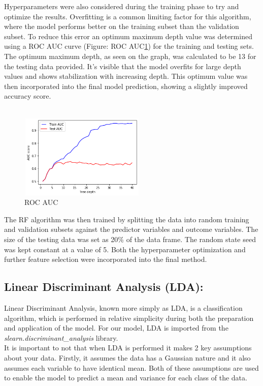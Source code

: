 \documentclass{article}
\begin{document}
Hyperparameters were also considered during the training phase to try and optimize the results\cite{rf-result}. Overfitting is a common limiting factor for this algorithm, where the model performs better on the training subset than the validation subset. To reduce this error an optimum maximum depth value was determined using a ROC AUC curve (Figure: ROC AUC\ref{fig:rf-auc}) for the training and testing sets\cite{rf-testing}. The optimum maximum depth, as seen on the graph, was calculated to be 13 for the testing data provided. It’s visible that the model overfits for large depth values and shows stabilization with increasing depth. This optimum value was then incorporated into the final model prediction, showing a slightly improved accuracy score.\\ \\
\begin{figure}[h]
 \centering
 \includegraphics[width=6cm, height=4cm]{rf-auc.png}
 \caption{ROC AUC}
 \label{fig:rf-auc}
\end{figure}

The RF algorithm was then trained by splitting the data into random training and validation subsets against the predictor variables and outcome variables. The size of the testing data was set as 20\% of the data frame. The random state seed was kept constant at a value of 5. Both the hyperparameter optimization and further feature selection were incorporated into the final method. 

\subsection{Linear Discriminant Analysis (LDA):}
Linear Discriminant Analysis, known more simply as LDA\cite{lda}, is a classification algorithm, which is performed in relative simplicity during both the preparation and application of the model. For our model, LDA is imported from the \textit{slearn.discriminant\_analysis} library. \\

It is important to not that when LDA\cite{sci-lda} is performed it makes 2 key assumptions about your data. Firstly, it assumes the data has a Gaussian nature and it also assumes each variable to have identical mean. Both of these assumptions are used to enable the model to predict a mean and variance for each class of the data. \\
\end{document}
